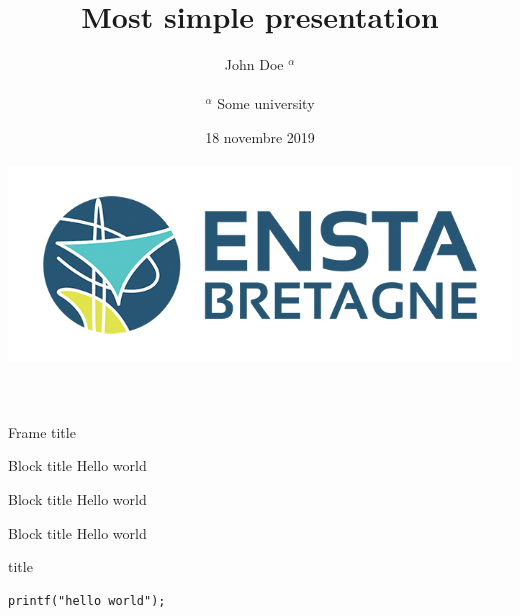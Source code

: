 \documentclass[aspectratio=169]{beamer}
\begin{document}
\title{Most simple presentation}
\author{John Doe $^{\alpha}$\\~\\
\small{$^{\alpha}$ Some university}} 
\date{18 novembre 2019\\~\\\includegraphics[width=.5\textwidth]{images/ensta-couleur}} 
\frame[plain]{\titlepage} 

\begin{frame}{Frame title}
\begin{exampleblock}{Block title}
Hello world
\end{exampleblock}
\begin{block}{Block title}
Hello world 
\end{block}
\begin{alertblock}{Block title}
Hello world \cite{Feynman1941}
\end{alertblock}
\end{frame}
\begin{frame}
\printbibliography
\end{frame}
\begin{frame}[fragile]{title}
\begin{lstlisting}[style=customc]
printf("hello world");
\end{lstlisting}
\end{frame}
\end{document}
